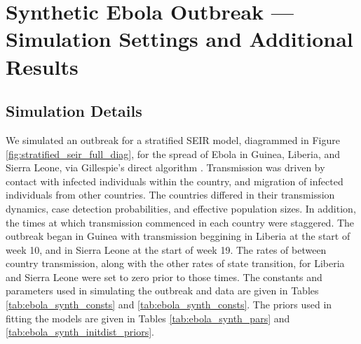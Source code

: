 \begin{table}
\begin{fullpage}
	\end{fullpage}
\end{table}

\newpage 
\section{Synthetic Ebola Outbreak --- Simulation Settings and Additional Results}
\label{sec:ebola_synth_supp}

\subsection{Simulation Details}
\label{subsec:ebola_synth_setup}

We simulated an outbreak for a stratified SEIR model, diagrammed in Figure \ref{fig:stratified_seir_full_diag}, for the spread of Ebola in Guinea, Liberia, and Sierra Leone, via Gillespie's direct algorithm \cite{gillespie1976general}. Transmission was driven by contact with infected individuals within the country, and migration of infected individuals from other countries. The countries differed in their transmission dynamics, case detection probabilities, and effective population sizes. In addition, the times at which transmission commenced in each country were staggered. The outbreak began in Guinea with transmission beggining in Liberia at the start of week 10, and in Sierra Leone at the start of week 19. The rates of between country transmission, along with the other rates of state transition, for Liberia and Sierra Leone were set to zero prior to those times. The constants and parameters used in simulating the outbreak and data are given in Tables \ref{tab:ebola_synth_consts} and \ref{tab:ebola_synth_consts}. The priors used in fitting the models are given in Tables \ref{tab:ebola_synth_pars} and \ref{tab:ebola_synth_initdist_priors}. 

